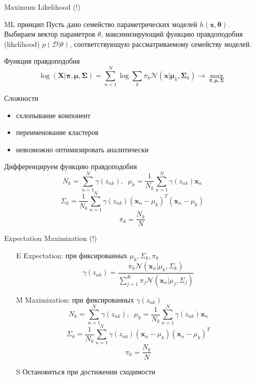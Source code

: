 \documentclass[10pt]{beamer}
\begin{document}
\begin{frame}{Maximum Likelihood (!)}

\begin{block}{ML принцип}
Пусть дано семейство параметрических моделей $h(\mathbf{x}, \mathbf{\theta})$. Выбираем вектор параметров $\theta$, максимизирующий функцию правдоподобия (likelihood) $p(\mathcal{D} | \theta)$, соответствующую рассматриваемому семейству моделей.
\end{block}

\vspace{1em}
Функция правдоподобия
\[
\log(\mathbf{X} | \mathbf{\pi}, \mathbf{\mu}, \mathbf{\Sigma}) = \sum_{n=1}^N \log \sum_k \pi_k \mathcal{N}(\mathbf{x} | \mathbf{\mu}_k, \mathbf{\Sigma}_k) \rightarrow \max_{\mathbf{\pi}, \mathbf{\mu}, \mathbf{\Sigma}}
\]

Сложности
\begin{itemize}
\item схлопывание компонент
\item переименование кластеров
\item невозможно оптимизировать аналитически
\end{itemize}

\end{frame}

\begin{frame}{}

Дифференцируем функцию правдоподобия
\[
N_k = \sum_{n=1}^N \gamma(z_{nk}), \;\; \mu_k = \frac 1 {N_k} \sum_{n=1}^N \gamma(z_{nk}) \mathbf{x}_n
\]
\[
\Sigma_k = \frac 1 {N_k} \sum_{n=1}^N \gamma(z_{nk}) (\mathbf{x}_n - \mu_k)^T (\mathbf{x}_n - \mu_k)
\]
\[
\pi_k = \frac{N_k}{N}
\]

\end{frame}

\begin{frame}{Expectation Maximization (!)}

\begin{enumerate}
\item[E] Expectation: при фиксированных $\mu_k, \Sigma_k, \pi_k$
\[
\gamma(z_{nk}) = \frac{\pi_k \mathcal{N} (\mathbf{x}_n | \mu_k, \Sigma_k)}{\sum_{j=1}^K \pi_j \mathcal{N} (\mathbf{x}_n | \mu_j, \Sigma_j)}
\]
\item[M] Maximization: при фиксированных $\gamma(z_{nk})$
\[
N_k = \sum_{n=1}^N \gamma(z_{nk}), \;\; \mu_k = \frac 1 {N_k} \sum_{n=1}^N \gamma(z_{nk}) \mathbf{x}_n
\]
\[
\Sigma_k = \frac 1 {N_k} \sum_{n=1}^N \gamma(z_{nk}) (\mathbf{x}_n - \mu_k)(\mathbf{x}_n - \mu_k)^T
\]
\[
\pi_k = \frac{N_k}{N}
\]
\item[S] Остановиться при достижении сходимости
\end{enumerate}

\end{frame}
\end{document}
